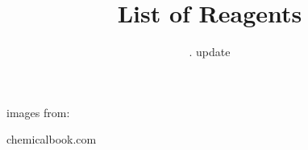 \documentclass[11pt,a4paper]{article}
\begin{document}
\columnseprule=0.3pt
\title{\textbf{\LARGE{}List of Reagents}}
\date{\number\year .\number\month{} update}
\maketitle
\begin{multicols}{3}
\begin{compactitem}

\Large
\item
\begin{flushleft}images from: \end{flushleft}
chemicalbook.com
\end{compactitem}
\end{multicols}
\end{document}
